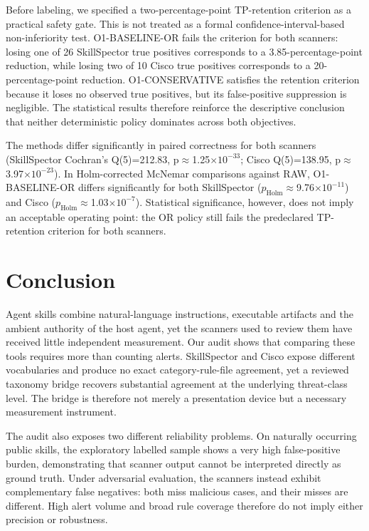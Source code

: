 \documentclass[conference]{IEEEtran}
\begin{document}
Before labeling, we specified a two-percentage-point TP-retention criterion as a practical safety gate. This is not treated as a formal confidence-interval-based non-inferiority test. O1-BASELINE-OR fails the criterion for both scanners: losing one of 26 SkillSpector true positives corresponds to a 3.85-percentage-point reduction, while losing two of 10 Cisco true positives corresponds to a 20-percentage-point reduction. O1-CONSERVATIVE satisfies the retention criterion because it loses no observed true positives, but its false-positive suppression is negligible. The statistical results therefore reinforce the descriptive conclusion that neither deterministic policy dominates across both objectives.

The methods differ significantly in paired correctness for both scanners (SkillSpector Cochran's Q(5)=212.83, p$\approx$1.25$\times 10^{-33}$; Cisco Q(5)=138.95, p$\approx$3.97$\times 10^{-23}$). In Holm-corrected McNemar comparisons against RAW, O1-BASELINE-OR differs significantly for both SkillSpector ($p_{\mathrm{Holm}}$$\approx$9.76$\times 10^{-11}$) and Cisco ($p_{\mathrm{Holm}}$$\approx$1.03$\times 10^{-7}$). Statistical significance, however, does not imply an acceptable operating point: the OR policy still fails the predeclared TP-retention criterion for both scanners.

\section{Conclusion}

Agent skills combine natural-language instructions, executable artifacts and the ambient authority of the host agent, yet the scanners used to review them have received little independent measurement. Our audit shows that comparing these tools requires more than counting alerts. SkillSpector and Cisco expose different vocabularies and produce no exact category-rule-file agreement, yet a reviewed taxonomy bridge recovers substantial agreement at the underlying threat-class level. The bridge is therefore not merely a presentation device but a necessary measurement instrument.

The audit also exposes two different reliability problems. On naturally occurring public skills, the exploratory labelled sample shows a very high false-positive burden, demonstrating that scanner output cannot be interpreted directly as ground truth. Under adversarial evaluation, the scanners instead exhibit complementary false negatives: both miss malicious cases, and their misses are different. High alert volume and broad rule coverage therefore do not imply either precision or robustness.
\end{document}
